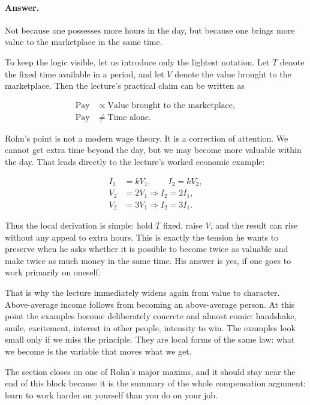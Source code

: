 \paragraph{Answer.} Not because one possesses more hours in the day, but because one brings more value to the marketplace in the same time.

To keep the logic visible, let us introduce only the lightest notation. Let \(T\) denote the fixed time available in a period, and let \(V\) denote the value brought to the marketplace. Then the lecture's practical claim can be written as

\begin{align}
\text{Pay} &\propto \text{Value brought to the marketplace},\\
\text{Pay} &\neq \text{Time alone}.
\end{align}

Rohn's point is not a modern wage theory. It is a correction of attention. We cannot get extra time beyond the day, but we may become more valuable within the day. That leads directly to the lecture's worked economic example:

\begin{align}
I_1 &= kV_1, \qquad I_2 = kV_2,\\
V_2 &= 2V_1 \Longrightarrow I_2 = 2I_1,\\
V_2 &= 3V_1 \Longrightarrow I_2 = 3I_1.
\end{align}

Thus the local derivation is simple: hold \(T\) fixed, raise \(V\), and the result can rise without any appeal to extra hours. This is exactly the tension he wants to preserve when he asks whether it is possible to become twice as valuable and make twice as much money in the same time. His answer is yes, if one goes to work primarily on oneself.

That is why the lecture immediately widens again from value to character. Above-average income follows from becoming an above-average person. At this point the examples become deliberately concrete and almost comic: handshake, smile, excitement, interest in other people, intensity to win. The examples look small only if we miss the principle. They are local forms of the same law: what we become is the variable that moves what we get.

The section closes on one of Rohn's major maxims, and it should stay near the end of this block because it is the summary of the whole compensation argument: learn to work harder on yourself than you do on your job.

